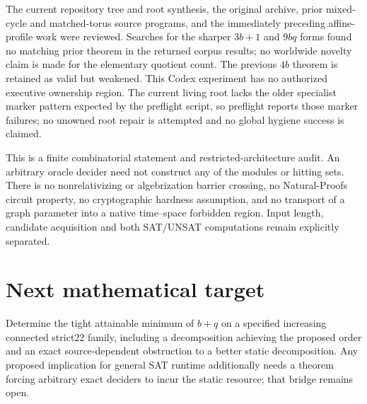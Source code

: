 \documentclass[11pt]{article}
\begin{document}
The current repository tree and root synthesis, the original archive, prior mixed-cycle and matched-torus source programs, and the immediately preceding affine-profile work were reviewed. Searches for the sharper $3b+1$ and $9bq$ forms found no matching prior theorem in the returned corpus results; no worldwide novelty claim is made for the elementary quotient count. The previous $4b$ theorem is retained as valid but weakened. This Codex experiment has no authorized executive ownership region. The current living root lacks the older specialist marker pattern expected by the preflight script, so preflight reports those marker failures; no unowned root repair is attempted and no global hygiene success is claimed.

This is a finite combinatorial statement and restricted-architecture audit. An arbitrary oracle decider need not construct any of the modules or hitting sets. There is no nonrelativizing or algebrization barrier crossing, no Natural-Proofs circuit property, no cryptographic hardness assumption, and no transport of a graph parameter into a native time--space forbidden region. Input length, candidate acquisition and both SAT/UNSAT computations remain explicitly separated.

\section{Next mathematical target}
Determine the tight attainable minimum of $b+q$ on a specified increasing connected strict22 family, including a decomposition achieving the proposed order and an exact source-dependent obstruction to a better static decomposition. Any proposed implication for general SAT runtime additionally needs a theorem forcing arbitrary exact deciders to incur the static resource; that bridge remains open.



\end{document}
